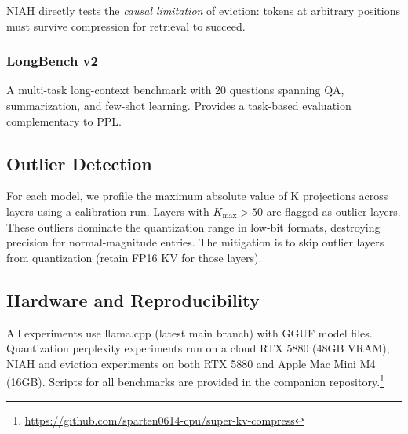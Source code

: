 NIAH directly tests the \emph{causal limitation} of eviction: tokens at arbitrary positions must survive compression for retrieval to succeed.

\subsubsection{LongBench v2}

A multi-task long-context benchmark with 20 questions spanning QA, summarization, and few-shot learning. Provides a task-based evaluation complementary to PPL.

\subsection{Outlier Detection}

For each model, we profile the maximum absolute value of K projections across layers using a calibration run. Layers with $K_\text{max} > 50$ are flagged as outlier layers. These outliers dominate the quantization range in low-bit formats, destroying precision for normal-magnitude entries. The mitigation is to skip outlier layers from quantization (retain FP16 KV for those layers).

\subsection{Hardware and Reproducibility}

All experiments use llama.cpp (latest main branch) with GGUF model files. Quantization perplexity experiments run on a cloud RTX 5880 (48GB VRAM); NIAH and eviction experiments on both RTX 5880 and Apple Mac Mini M4 (16GB). Scripts for all benchmarks are provided in the companion repository.\footnote{\url{https://github.com/sparten0614-cpu/super-kv-compress}}
